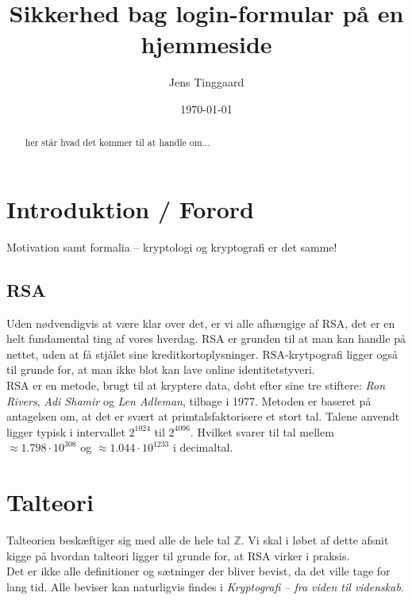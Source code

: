 \documentclass[a4paper, 12pt]{article}
\date{\today}
\title{Sikkerhed bag login-formular på en hjemmeside}
\author{Jens Tinggaard}
\theoremstyle{break}
\theoremstyle{breakline}
\begin{document}
\clearpage\maketitle
\thispagestyle{empty}
\maketitle

\begin{abstract} %
her står hvad det kommer til at handle om...
\end{abstract}



\newpage
\tableofcontents


\newpage
\section*{Introduktion / Forord}
Motivation samt formalia -- kryptologi og kryptografi er det samme!


\subsection*{RSA}
Uden nødvendigvis at være klar over det, er vi alle afhængige af RSA, det er en helt fundamental ting af vores hverdag.
RSA er grunden til at man kan handle på nettet, uden at få stjålet sine kreditkortoplysninger.
RSA-krytpografi ligger også til grunde for, at man ikke blot kan lave online identitetstyveri.\cite{vestergaard}
\\

RSA er en metode, brugt til at kryptere data, døbt efter sine tre stiftere:
\textit{Ron Rivers}, \textit{Adi Shamir} og \textit{Len Adleman}, tilbage i 1977.\cite{vestergaard}
Metoden er baseret på antagelsen om, at det er svært at primtalsfaktorisere et stort tal.
Talene anvendt ligger typisk i intervallet \(2^{1024}\) til \(2^{4096}\).
Hvilket svarer til tal mellem \(\approx 1.798 \cdot 10^{308}\) og \(\approx 1.044 \cdot 10^{1233}\) i decimaltal.\cite[21]{frividen}



\newpage
\section{Talteori}
Talteorien beskæftiger sig med alle de hele tal \(\mathbb{Z}\).
Vi skal i løbet af dette afsnit kigge på hvordan talteori ligger til grunde for, at RSA virker i praksis.
\\
Det er ikke alle definitioner og sætninger der bliver bevist, da det ville tage for lang tid.
Alle beviser kan naturligvis findes i \textit{Kryptografi -- fra viden til videnskab}. \cite{krypto}
\end{document}
